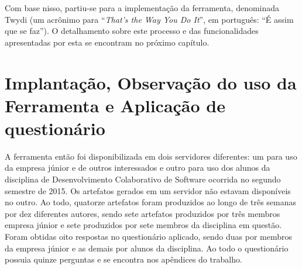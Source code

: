 Com base nisso, partiu-se para a implementação da ferramenta, denominada Twydi (um acrônimo para ``\textit{That's the Way You Do It}'', em português: ``É assim que se faz''). O detalhamento sobre este processo e das funcionalidades apresentadas por esta se encontram no próximo capítulo.

\section{Implantação, Observação do uso da Ferramenta e Aplicação de questionário}

A ferramenta então foi disponibilizada em dois servidores diferentes: um para uso da empresa júnior e de outros interessados e outro para uso dos alunos da disciplina de Desenvolvimento Colaborativo de Software ocorrida no segundo semestre de 2015. Os artefatos gerados em um servidor não estavam disponíveis no outro. Ao todo, quatorze artefatos foram produzidos ao longo de três semanas por dez diferentes autores, sendo sete artefatos produzidos por três membros empresa júnior e sete produzidos por sete membros da disciplina em questão. Foram obtidas oito respostas no questionário aplicado, sendo duas por membros da empresa júnior e as demais por alunos da disciplina. Ao todo o questionário possuia quinze perguntas e se encontra nos apêndices do trabalho.

